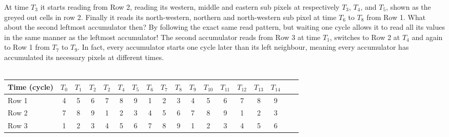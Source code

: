 At time $T_{3}$ it starts reading from Row 2, reading its western, middle and eastern sub pixels at respectively $T_{3}$, $T_{4}$, and $T_{5}$, shown as the greyed out cells in row 2.
Finally it reads its north-western, northern and north-western sub pixel at time $T_{6}$ to $T_{8}$ from Row 1.
What about the second leftmost accumulator then? By following the exact same read pattern, but waiting one cycle allows it to read all its values in the same manner as the leftmost accumulator!
The second accumulator reads from Row 3 at time $T_{1}$, switches to Row 2 at $T_{4}$ and again to Row 1 from $T_{7}$ to $T_{9}$. 
In fact, every accumulator starts one cycle later than its left neighbour, meaning every accumulator has accumulated its necessary pixels at different times.
\\ \\
\begin{tabular}{l*{16}{c}r}
    Time (cycle)        & $T_{0}$ & $T_{1}$ & $T_{2}$ & $T_{2}$ & $T_{4}$  & $T_{5}$ & $T_{6}$ & $T_{7}$ & $T_{8}$ & $T_{9}$ & $T_{10}$ & $T_{11}$ & $T_{12}$ & $T_{13}$ & $T_{14}$\\
\hline
Row 1                   & \cellcolor{gray75} 4 & 5 & 6 & 7 & 8 & 9 & 1 & \cellcolor{gray75} 2 & \cellcolor{gray75} 3 & 4\cellcolor{gray75} & 5 & 6 & 7 & 8 & 9 & \\
Row 2                   & 7 & 8 & 9 & 1 & \cellcolor{gray75} 2 & \cellcolor{gray75} 3 & \cellcolor{gray75}4 & 5 & 6 & 7 & 8 & 9 & 1 & \cellcolor{gray75} 2 & \cellcolor{gray75} 3 & \\
Row 3                   & 1 & \cellcolor{gray75} 2 & \cellcolor{gray75} 3 & 4\cellcolor{gray75} & 5 & 6 & 7 & 8 & 9 & 1 & \cellcolor{gray75} 2 & \cellcolor{gray75} 3 & 4\cellcolor{gray75} & 5 & 6 & \\
\end{tabular}\\ \\ \\

